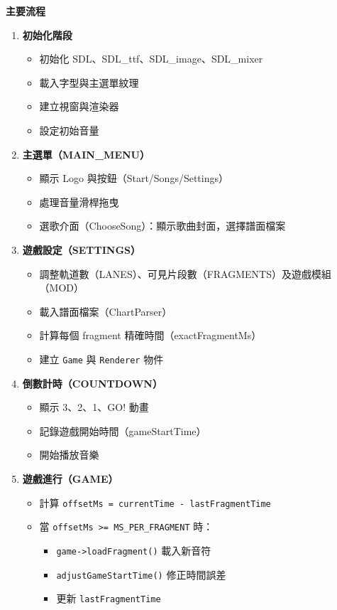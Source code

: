 \documentclass[a4paper,12pt]{article}
\begin{document}
\textbf{主要流程}
\begin{enumerate}
  \item \textbf{初始化階段}
  \begin{itemize}
    \item 初始化 SDL、SDL\_ttf、SDL\_image、SDL\_mixer
    \item 載入字型與主選單紋理
    \item 建立視窗與渲染器
    \item 設定初始音量
  \end{itemize}
  \item \textbf{主選單（MAIN\_MENU）}
  \begin{itemize}
    \item 顯示 Logo 與按鈕（Start/Songs/Settings）
    \item 處理音量滑桿拖曳
    \item 選歌介面（ChooseSong）：顯示歌曲封面，選擇譜面檔案
  \end{itemize}
  \item \textbf{遊戲設定（SETTINGS）}
  \begin{itemize}
    \item 調整軌道數（LANES）、可見片段數（FRAGMENTS）及遊戲模組（MOD）
    \item 載入譜面檔案（ChartParser）
    \item 計算每個 fragment 精確時間（exactFragmentMs）
    \item 建立 \verb|Game| 與 \verb|Renderer| 物件
  \end{itemize}
  \item \textbf{倒數計時（COUNTDOWN）}
  \begin{itemize}
    \item 顯示 3、2、1、GO! 動畫
    \item 記錄遊戲開始時間（gameStartTime）
    \item 開始播放音樂
  \end{itemize}
  \item \textbf{遊戲進行（GAME）}
  \begin{itemize}
    \item 計算 \verb|offsetMs = currentTime - lastFragmentTime|
    \item 當 \verb|offsetMs >= MS_PER_FRAGMENT| 時：
    \begin{itemize}
      \item \verb|game->loadFragment()| 載入新音符
      \item \verb|adjustGameStartTime()| 修正時間誤差
      \item 更新 \verb|lastFragmentTime|

\end{itemize}
\end{itemize}
\end{enumerate}
\end{document}
